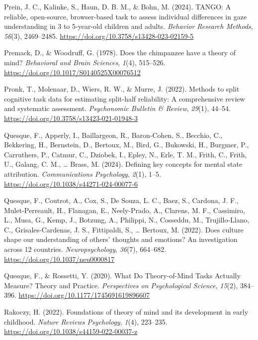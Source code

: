 \documentclass[
]{scrbook}
\newlength{\cslhangindent}
\newenvironment{CSLReferences}[2] %
 {\begin{list}{}{%
  \setlength{\itemindent}{0pt}
  \setlength{\leftmargin}{0pt}
  \setlength{\parsep}{0pt}
  \ifodd #1
   \setlength{\leftmargin}{\cslhangindent}
   \setlength{\itemindent}{-1\cslhangindent}
  \fi
  \setlength{\itemsep}{#2\baselineskip}}}
 {\end{list}}
\begin{document}
\begin{CSLReferences}{1}{0}
Prein, J. C., Kalinke, S., Haun, D. B. M., \& Bohn, M. (2024). {TANGO}: {A} reliable, open-source, browser-based task to assess individual differences in gaze understanding in 3 to 5-year-old children and adults. \emph{Behavior Research Methods}, \emph{56}(3), 2469--2485. \url{https://doi.org/10.3758/s13428-023-02159-5}

Premack, D., \& Woodruff, G. (1978). Does the chimpanzee have a theory of mind? \emph{Behavioral and Brain Sciences}, \emph{1}(4), 515--526. \url{https://doi.org/10.1017/S0140525X00076512}

Pronk, T., Molenaar, D., Wiers, R. W., \& Murre, J. (2022). Methods to split cognitive task data for estimating split-half reliability: {A} comprehensive review and systematic assessment. \emph{Psychonomic Bulletin \& Review}, \emph{29}(1), 44--54. \url{https://doi.org/10.3758/s13423-021-01948-3}

Quesque, F., Apperly, I., Baillargeon, R., Baron-Cohen, S., Becchio, C., Bekkering, H., Bernstein, D., Bertoux, M., Bird, G., Bukowski, H., Burgmer, P., Carruthers, P., Catmur, C., Dziobek, I., Epley, N., Erle, T. M., Frith, C., Frith, U., Galang, C. M., \ldots{} Brass, M. (2024). Defining key concepts for mental state attribution. \emph{Communications Psychology}, \emph{2}(1), 1--5. \url{https://doi.org/10.1038/s44271-024-00077-6}

Quesque, F., Coutrot, A., Cox, S., De Souza, L. C., Baez, S., Cardona, J. F., Mulet-Perreault, H., Flanagan, E., Neely-Prado, A., Clarens, M. F., Cassimiro, L., Musa, G., Kemp, J., Botzung, A., Philippi, N., Cosseddu, M., Trujillo-Llano, C., Grisales-Cardenas, J. S., Fittipaldi, S., \ldots{} Bertoux, M. (2022). Does culture shape our understanding of others' thoughts and emotions? {An} investigation across 12 countries. \emph{Neuropsychology}, \emph{36}(7), 664--682. \url{https://doi.org/10.1037/neu0000817}

Quesque, F., \& Rossetti, Y. (2020). What {Do Theory-of-Mind Tasks Actually Measure}? {Theory} and {Practice}. \emph{Perspectives on Psychological Science}, \emph{15}(2), 384--396. \url{https://doi.org/10.1177/1745691619896607}

Rakoczy, H. (2022). Foundations of theory of mind and its development in early childhood. \emph{Nature Reviews Psychology}, \emph{1}(4), 223--235. \url{https://doi.org/10.1038/s44159-022-00037-z}


\end{CSLReferences}
\end{document}
